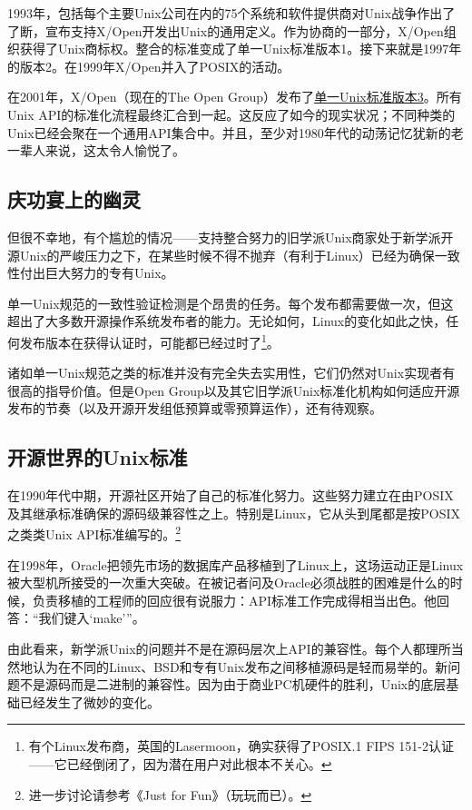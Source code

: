 \documentclass[12pt,oneside]{book}
\begin{document}
\begin{common-format}
1993年，包括每个主要Unix公司在内的75个系统和软件提供商对Unix战争作出了了断，宣布支持X/Open开发出Unix的通用定义。作为协商的一部分，X/Open组织获得了Unix商标权。整合的标准变成了单一Unix标准版本1。接下来就是1997年的版本2。在1999年X/Open并入了POSIX的活动。

在2001年，X/Open（现在的The Open Group）发布了\href{http://www.unix.org/version3/}{单一Unix标准版本3}。所有Unix API的标准化流程最终汇合到一起。这反应了如今的现实状况；不同种类的Unix已经会聚在一个通用API集合中。并且，至少对1980年代的动荡记忆犹新的老一辈人来说，这太令人愉悦了。

\subsection{庆功宴上的幽灵}
但很不幸地，有个尴尬的情况——支持整合努力的旧学派Unix商家处于新学派开源Unix的严峻压力之下，在某些时候不得不抛弃（有利于Linux）已经为确保一致性付出巨大努力的专有Unix。

单一Unix规范的一致性验证检测是个昂贵的任务。每个发布都需要做一次，但这超出了大多数开源操作系统发布者的能力。无论如何，Linux的变化如此之快，任何发布版本在获得认证时，可能都已经过时了\footnote{有个Linux发布商，英国的Lasermoon，确实获得了POSIX.1 FIPS 151-2认证——它已经倒闭了，因为潜在用户对此根本不关心。}。

诸如单一Unix规范之类的标准并没有完全失去实用性，它们仍然对Unix实现者有很高的指导价值。但是Open Group以及其它旧学派Unix标准化机构如何适应开源发布的节奏（以及开源开发组低预算或零预算运作），还有待观察。


\subsection{开源世界的Unix标准}
在1990年代中期，开源社区开始了自己的标准化努力。这些努力建立在由POSIX及其继承标准确保的源码级兼容性之上。特别是Linux，它从头到尾都是按POSIX之类类Unix API标准编写的。\footnote{进一步讨论请参考《Just for Fun》（玩玩而已）\cite{Torvalds}。}

在1998年，Oracle把领先市场的数据库产品移植到了Linux上，这场运动正是Linux被大型机所接受的一次重大突破。在被记者问及Oracle必须战胜的困难是什么的时候，负责移植的工程师的回应很有说服力：API标准工作完成得相当出色。他回答：“我们键入‘make’”。

由此看来，新学派Unix的问题并不是在源码层次上API的兼容性。每个人都理所当然地认为在不同的Linux、BSD和专有Unix发布之间移植源码是轻而易举的。新问题不是源码而是二进制的兼容性。因为由于商业PC机硬件的胜利，Unix的底层基础已经发生了微妙的变化。


\end{common-format}
\end{document}

